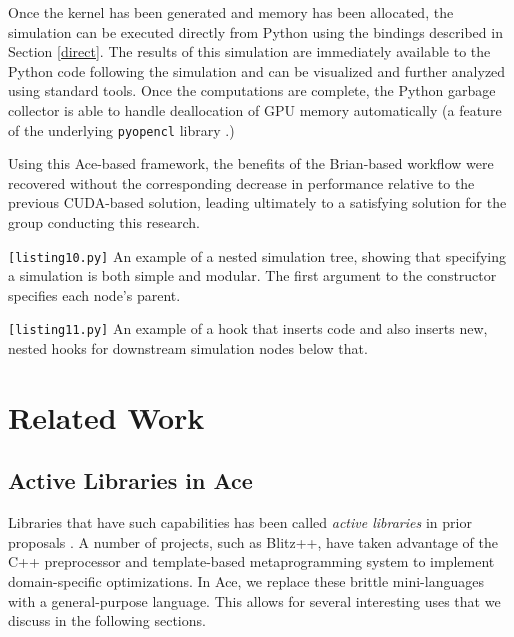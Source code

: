 \documentclass{sig-alternate}
\begin{document}
Once the kernel has been generated and memory has been allocated, the simulation can be executed directly from Python using the bindings described in Section \ref{direct}. The results of this simulation are immediately available to the Python code following the simulation and can be visualized and further analyzed using standard tools. Once the computations are complete, the Python garbage collector is able to handle deallocation of GPU memory automatically (a feature of the underlying \verb|pyopencl| library \cite{klockner2011pycuda}.)

Using this Ace-based framework, the benefits of the Brian-based workflow were recovered without the  corresponding decrease in performance relative to the previous CUDA-based solution, leading ultimately to a satisfying solution for the group conducting this research.

\begin{codelisting}

\caption{\texttt{[listing10.py]} An example of a nested simulation tree, showing that specifying a simulation is both simple and modular. The first argument to the constructor specifies each node's parent.}
\label{spec}
\end{codelisting}

\begin{codelisting}

\caption{\texttt{[listing11.py]} An example of a hook that inserts code and also inserts new, nested hooks for downstream simulation nodes  below that.}
\label{impl}
\end{codelisting}

\section{Related Work}
\subsection{Active Libraries in Ace}
Libraries that have such capabilities has been called {\it active libraries} in prior proposals \cite{activelibraries}. A number of  projects, such as Blitz++, have taken advantage of the C++ preprocessor and template-based metaprogramming system to implement domain-specific optimizations. In Ace, we replace these brittle mini-languages with a general-purpose language. This allows for several interesting uses that we discuss in the following sections.
\end{document}
